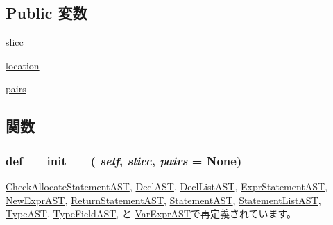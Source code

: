 \subsection*{Public 変数}
\begin{DoxyCompactItemize}
\item 
\hyperlink{classslicc_1_1ast_1_1AST_1_1AST_af640ba17d962addde6088eeefb07aad9}{slicc}
\item 
\hyperlink{classslicc_1_1ast_1_1AST_1_1AST_a5f269c22e6d9d32b0b0ad7e6166854df}{location}
\item 
\hyperlink{classslicc_1_1ast_1_1AST_1_1AST_a8b16b1e1994f9c318702b801bd3b8420}{pairs}
\end{DoxyCompactItemize}


\subsection{関数}
\hypertarget{classslicc_1_1ast_1_1AST_1_1AST_ac775ee34451fdfa742b318538164070e}{
\subsubsection[{\_\-\_\-init\_\-\_\-}]{\setlength{\rightskip}{0pt plus 5cm}def \_\-\_\-init\_\-\_\- ( {\em self}, \/   {\em slicc}, \/   {\em pairs} = {\ttfamily None})}}
\label{classslicc_1_1ast_1_1AST_1_1AST_ac775ee34451fdfa742b318538164070e}


\hyperlink{classslicc_1_1ast_1_1CheckAllocateStatementAST_1_1CheckAllocateStatementAST_ac775ee34451fdfa742b318538164070e}{CheckAllocateStatementAST}, \hyperlink{classslicc_1_1ast_1_1DeclAST_1_1DeclAST_ac775ee34451fdfa742b318538164070e}{DeclAST}, \hyperlink{classslicc_1_1ast_1_1DeclListAST_1_1DeclListAST_ac775ee34451fdfa742b318538164070e}{DeclListAST}, \hyperlink{classslicc_1_1ast_1_1ExprStatementAST_1_1ExprStatementAST_ac775ee34451fdfa742b318538164070e}{ExprStatementAST}, \hyperlink{classslicc_1_1ast_1_1NewExprAST_1_1NewExprAST_ac775ee34451fdfa742b318538164070e}{NewExprAST}, \hyperlink{classslicc_1_1ast_1_1ReturnStatementAST_1_1ReturnStatementAST_ac775ee34451fdfa742b318538164070e}{ReturnStatementAST}, \hyperlink{classslicc_1_1ast_1_1StatementAST_1_1StatementAST_ac775ee34451fdfa742b318538164070e}{StatementAST}, \hyperlink{classslicc_1_1ast_1_1StatementListAST_1_1StatementListAST_ac775ee34451fdfa742b318538164070e}{StatementListAST}, \hyperlink{classslicc_1_1ast_1_1TypeAST_1_1TypeAST_ac775ee34451fdfa742b318538164070e}{TypeAST}, \hyperlink{classslicc_1_1ast_1_1TypeFieldAST_1_1TypeFieldAST_ac775ee34451fdfa742b318538164070e}{TypeFieldAST}, と \hyperlink{classslicc_1_1ast_1_1VarExprAST_1_1VarExprAST_ac775ee34451fdfa742b318538164070e}{VarExprAST}で再定義されています。


